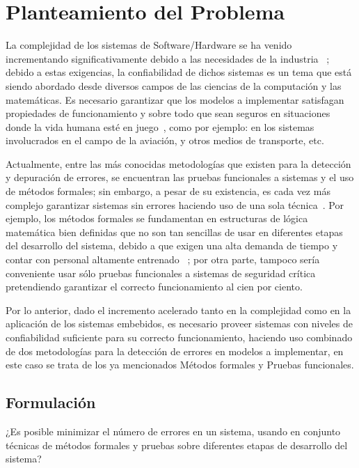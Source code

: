 

\section{Planteamiento del Problema}

La complejidad de los sistemas de Software/Hardware se ha venido incrementando 
significativamente debido a las necesidades de la industria 
~\cite{Clarke1996,Schneider2004,AlexeiSernaA}; debido a estas exigencias, la 
confiabilidad de dichos sistemas es un tema que est\'a siendo abordado desde 
diversos campos de las ciencias de la computaci\'on y las matem\'aticas. Es 
necesario garantizar que los modelos a implementar satisfagan propiedades de 
funcionamiento y sobre todo que sean seguros en situaciones donde la vida humana 
est\'e en juego~\cite{Gaudel1996,Bowen2000}, como por ejemplo: en los sistemas 
involucrados en el campo de la aviaci\'on, y otros medios de transporte, etc.

Actualmente, entre las m\'as conocidas metodolog\'ias que existen para la 
detecci\'on y depuraci\'on de errores, se encuentran las pruebas funcionales a 
sistemas y el uso de m\'etodos formales; sin embargo, a pesar de su existencia, 
es cada vez m\'as complejo garantizar sistemas sin errores haciendo uso de una 
sola t\'ecnica~\cite{Gaudel1996}. Por ejemplo, los m\'etodos formales se 
fundamentan en estructuras de l\'ogica matem\'atica bien definidas que no son 
tan sencillas de usar en diferentes etapas del desarrollo del sistema, debido a 
que exigen una alta demanda de tiempo y contar con personal altamente entrenado 
~\cite{AlexeiSernaA}; por otra parte, tampoco ser\'ia conveniente usar s\'olo 
pruebas funcionales a sistemas de seguridad cr\'itica pretendiendo garantizar 
el correcto funcionamiento al cien por ciento.

Por lo anterior, dado el incremento acelerado tanto en la complejidad como en la 
aplicaci\'on de los sistemas embebidos, es necesario proveer sistemas con niveles de 
confiabilidad suficiente para su correcto funcionamiento, haciendo uso combinado de dos metodolog\'ias 
para la detecci\'on de errores en modelos a implementar, en este caso se trata 
de los ya mencionados M\'etodos formales y Pruebas funcionales.

\subsection{Formulaci\'on}

¿Es posible minimizar el n\'umero de errores en un sistema, usando en conjunto 
t\'ecnicas de m\'etodos formales y pruebas sobre diferentes etapas de desarrollo 
del sistema?

